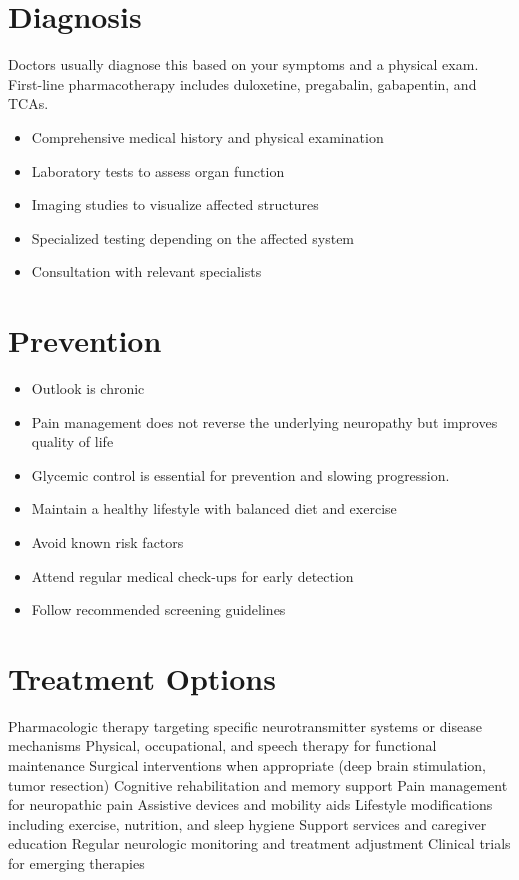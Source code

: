 \section{Diagnosis}
Doctors usually diagnose this based on your symptoms and a physical exam. First-line pharmacotherapy includes duloxetine, pregabalin, gabapentin, and TCAs.

\begin{itemize}[noitemsep]
  \item Comprehensive medical history and physical examination
  \item Laboratory tests to assess organ function
  \item Imaging studies to visualize affected structures
  \item Specialized testing depending on the affected system
  \item Consultation with relevant specialists
\end{itemize}
\section{Prevention}
\begin{itemize}[noitemsep]
  \item Outlook is chronic
  \item Pain management does not reverse the underlying neuropathy but improves quality of life
  \item Glycemic control is essential for prevention and slowing progression.
  \item Maintain a healthy lifestyle with balanced diet and exercise
  \item Avoid known risk factors
  \item Attend regular medical check-ups for early detection
  \item Follow recommended screening guidelines
\end{itemize}
\section{Treatment Options}
Pharmacologic therapy targeting specific neurotransmitter systems or disease mechanisms Physical, occupational, and speech therapy for functional maintenance Surgical interventions when appropriate (deep brain stimulation, tumor resection) Cognitive rehabilitation and memory support Pain management for neuropathic pain Assistive devices and mobility aids Lifestyle modifications including exercise, nutrition, and sleep hygiene Support services and caregiver education Regular neurologic monitoring and treatment adjustment Clinical trials for emerging therapies

